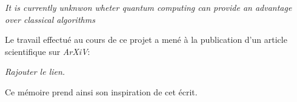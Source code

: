 \begin{comment}
\end{comment}

\Introduction   %


\textcolor{mydarkred}{\textit{It is currently unknwon wheter quantum computing can provide an advantage over classical algorithms}}







Le travail effectué au cours de ce projet a mené à la publication d'un article scientifique sur \textit{ArXiV}:

\textcolor{mydarkred}{\textit{Rajouter le lien.}}

Ce mémoire prend ainsi son inspiration de cet écrit.